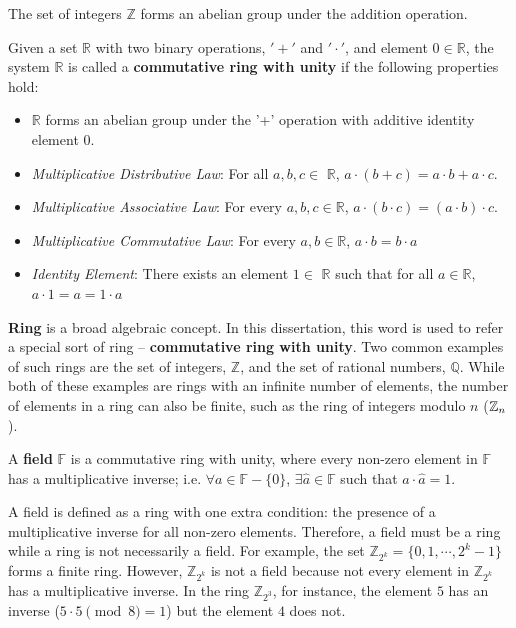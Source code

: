 The set of integers $\mathbb{Z}$ forms an abelian group under the addition operation. 

\begin{Definition}
Given a set $\mathbb{R}$ with two binary operations, $'+'$ and $'\cdot'$, 
and element $0 \in \mathbb{R}$, the system $\mathbb{R}$ is called a {\bf commutative ring with unity} if the following properties hold:
\begin{itemize}
\item $\mathbb{R}$ forms an abelian group under the '+' operation with additive identity element $0$.
\item {\it Multiplicative Distributive Law}: For all $a, b, c \in$ $\mathbb{R}$, $a\cdot (b + c) = a\cdot b + a\cdot c$.
\item {\it Multiplicative Associative Law}: For every $a, b, c\in \mathbb{R}$, $a\cdot (b\cdot c) = (a\cdot b)\cdot c$. 
\item {\it Multiplicative Commutative Law}: For every $a,b \in \mathbb{R}$, $a\cdot b = b\cdot a$
\item {\it Identity Element}: There exists an element $1 \in$ $\mathbb{R}$ 
such that for all $a \in \mathbb{R}$, $a\cdot 1 = a =1\cdot a$
\end{itemize}
\end{Definition}

{\bf Ring} is a broad algebraic concept. In this dissertation, this word is used to refer a special 
sort of ring -- {\bf commutative ring with unity}. Two common 
examples of such rings are the set of integers, $\mathbb{Z}$, and the set of 
rational numbers, $\mathbb{Q}$. While both of these examples are
rings with an infinite number of elements, the number of elements in a ring 
can also be finite, such as the ring of integers modulo $n$ (${\mathbb{Z}}_n$).

\begin{Definition}
A {\bf field} $\mathbb{F}$ is a commutative ring with unity, where every
non-zero element in $\mathbb{F}$ has a multiplicative inverse; i.e. $\forall
a \in \mathbb{F} - \{0\}$, $\exists \hat{a} \in \mathbb{F}$ such that $ a \cdot
\hat{a} = 1$.
\end{Definition}

A field is defined as a ring with one extra condition: the presence of a 
multiplicative inverse for all non-zero elements.
Therefore, a field must be a ring while a ring is not necessarily a field.
For example, the set $\mathbb{Z}_{2^k} = \{0,1,\cdots, 2^k-1\}$ forms a finite ring.
However, $\mathbb{Z}_{2^k}$ is not a field because not every element in
$\mathbb{Z}_{2^k}$ has a multiplicative inverse. 
In the ring $\mathbb{Z}_{2^3}$, for 
instance, the element $5$ has an inverse ($5\cdot5\pmod{8}=1$) but the element $4$
does not.

